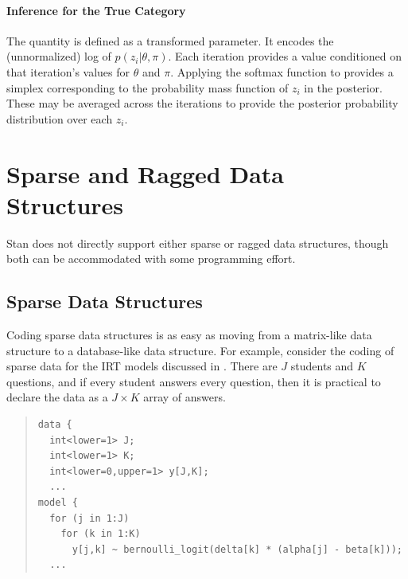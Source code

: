 \subsubsection{Inference for the True Category}

The quantity  is defined as a transformed
parameter.  It encodes the (unnormalized) log of $p(z_i | \theta,
\pi)$.  Each iteration provides a value conditioned on that
iteration's values for $\theta$ and $\pi$.  Applying the softmax
function to  provides a simplex corresponding to
the probability mass function of $z_i$ in the posterior.   These may
be averaged across the iterations to provide the posterior probability
distribution over each $z_i$.


\chapter{Sparse and Ragged Data Structures}

\noindent
Stan does not directly support either sparse or ragged data
structures, though both can be accommodated with some programming
effort. 

\section{Sparse Data Structures}

Coding sparse data structures is as easy as moving from a matrix-like
data structure to a database-like data structure.  For example,
consider the coding of sparse data for the IRT models discussed in
.  There are $J$ students and $K$
questions, and if every student answers every question, then it is
practical to declare the data as a $J \times K$ array of answers.
%
\begin{quote}
\begin{Verbatim}
data {
  int<lower=1> J;
  int<lower=1> K;
  int<lower=0,upper=1> y[J,K];
  ...
model {
  for (j in 1:J)
    for (k in 1:K)
      y[j,k] ~ bernoulli_logit(delta[k] * (alpha[j] - beta[k]));
  ...
\end{Verbatim}
\end{quote}
%

